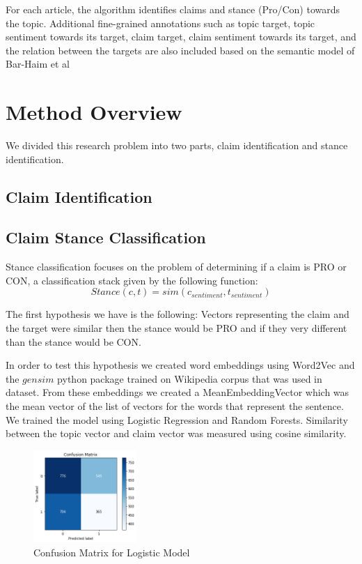 \documentclass[11pt,a4paper]{article}
\begin{document}
For each article, the algorithm identifies claims and stance (Pro/Con) towards the topic. Additional fine-grained annotations such as topic target, topic sentiment towards its target, claim target, claim sentiment towards its target, and the relation between the targets are also included based on the semantic model of Bar-Haim et al 

\section{Method Overview}
We divided this research problem into two parts, claim identification and stance identification.
\subsection{Claim Identification}
\subsection{Claim Stance Classification}

Stance classification focuses on the problem of determining if a claim is PRO or CON, a classification stack given by the following function:
\begin{equation}
Stance(c, t)=  sim(c_{sentiment}, t_{sentiment})
\end{equation}

The first hypothesis we have is the following:  Vectors representing the claim and the target were similar then the stance would be PRO and if they very different than the stance would be CON.

In order to test this hypothesis we created word embeddings using Word2Vec and the $gensim$ python package trained on Wikipedia corpus that was used in dataset.  From these embeddings we created a MeanEmbeddingVector which was the mean vector of the list of vectors for the words that represent the sentence.  We trained the model using Logistic Regression and Random Forests.  Similarity between the topic vector and claim vector was measured using cosine similarity.  

\begin{figure}[H]
    \centering
    \includegraphics[width=0.35\textwidth]{stance_w2v_lr}
    \caption{\label{font-table} Confusion Matrix for Logistic Model }
\end{figure} 
\end{document}
